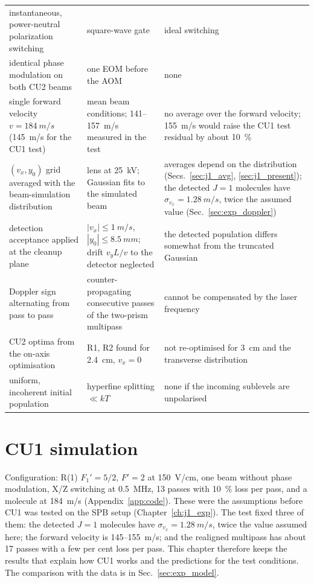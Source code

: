 \documentclass[11pt,a4paper,oneside]{report}
\begin{document}
\begin{table}[htbp]
\begin{tabularx}{\textwidth}{>{\raggedright\arraybackslash}p{}LL}
    instantaneous, power-neutral polarization switching & square-wave gate & ideal switching \\
    identical phase modulation on both CU2 beams & one EOM before the AOM & none \\
    single forward velocity $v=\SI{184}{m/s}$ (\SI{145}{m/s} for the CU1 test) & mean beam
      conditions; 141--\SI{157}{m/s} measured in the test & no average over the forward velocity;
      \SI{155}{m/s} would raise the CU1 test residual by about \SI{10}{\percent} \\
    $(v_x,y_0)$ grid averaged with the beam-simulation distribution & lens at \SI{25}{kV};
      Gaussian fits to the simulated beam & averages depend on the distribution
      (Secs.~\ref{sec:j1_avg}, \ref{sec:j1_present}); the detected $J=1$ molecules have
      $\sigma_{v_x}=\SI{1.28}{m/s}$, twice the assumed value (Sec.~\ref{sec:exp_doppler}) \\
    detection acceptance applied at the cleanup plane & $|v_x|\leq\SI{1}{m/s}$,
      $|y_0|\leq\SI{8.5}{mm}$; drift $v_yL/v$ to the detector neglected & the detected
      population differs somewhat from the truncated Gaussian \\
    Doppler sign alternating from pass to pass & counter-propagating consecutive passes
      of the two-prism multipass & cannot be compensated by the laser frequency \\
    CU2 optima from the on-axis optimisation & R1, R2 found for \SI{2.4}{cm}, $v_x=0$ & not
      re-optimised for \SI{3}{cm} and the transverse distribution \\
    uniform, incoherent initial population & hyperfine splitting $\ll kT$ & none if the
      incoming sublevels are unpolarised \\
    \bottomrule
  \end{tabularx}
\end{table}

\chapter{CU1 simulation}
\label{ch:j1}

Configuration: R(1) $F_1'=5/2$, $F'=2$ at \SI{150}{V/cm}, one beam without phase modulation,
X/Z switching at \SI{0.5}{MHz}, 13 passes with \SI{10}{\percent} loss per pass, and a molecule
at \SI{184}{m/s} (Appendix~\ref{app:code}). These were the assumptions before CU1 was tested on
the SPB setup (Chapter~\ref{ch:j1_exp}). The test fixed three of them: the detected $J=1$
molecules have $\sigma_{v_x}=\SI{1.28}{m/s}$, twice the value assumed here; the forward velocity
is 145--\SI{155}{m/s}; and the realigned multipass has about 17 passes with a few per cent loss
per pass. This chapter therefore keeps the results that explain how CU1 works and the predictions
for the test conditions. The comparison with the data is in Sec.~\ref{sec:exp_model}.
\end{document}
